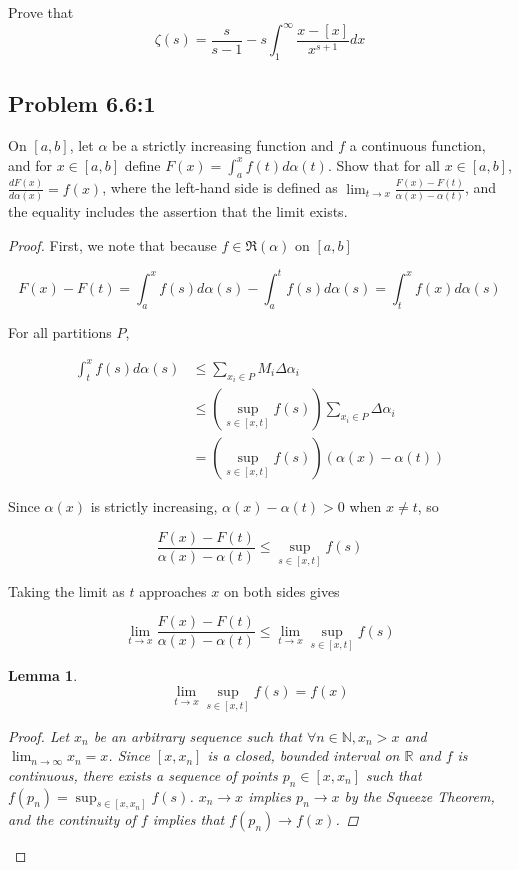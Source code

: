 \documentclass{amsart}
\newcommand{\RiemannIntable}{
  \mathfrak{R}
}
\newtheorem{lemma}[theorem]{Lemma}
\begin{document}
Prove that
\[
\zeta(s) = \frac{s}{s-1} - s\int_1^\infty \frac{x -[x]}{x^{s+1}}dx
\]

\subsection*{Problem 6.6:1}

On $[a, b]$, let $\alpha$ be a strictly increasing function and $f$ a continuous function, and for $x \in [a, b]$ define $F(x) = \int_a^x f(t) d\alpha(t)$. Show that for all $x \in [a, b]$, $\frac{dF(x)}{d \alpha(x)} = f(x)$, where the left-hand side is defined as $\lim_{t \to x} \frac{F(x) - F(t)}{\alpha(x) - \alpha(t)}$, and the equality includes the assertion that the limit exists.

\begin{proof}

First, we note that because $f \in \RiemannIntable(\alpha)$ on $[a, b]$

\[F(x) - F(t) = \int_a^x f(s)d\alpha(s) - \int_a^t f(s) d\alpha(s) = \int_t^x f(x) d\alpha(s)
\]

For all partitions $P$,

\begin{align*}
\int_t^x f(s) d\alpha(s)
& \leq \sum_{x_i \in P} M_i \Delta \alpha_i \\
& \leq \left(\sup_{s \in [x, t]} f(s) \right) \sum_{x_i \in P} \Delta \alpha_i \\
&= \left(\sup_{s \in [x, t]} f(s) \right) (\alpha(x) - \alpha(t))
\end{align*}

Since $\alpha(x)$ is strictly increasing, $\alpha(x) - \alpha(t) > 0$ when $x \neq t$, so

\[
\frac{F(x) - F(t)}{\alpha(x) - \alpha(t)} \leq \sup_{s \in [x, t]} f(s)
\]

Taking the limit as $t$ approaches $x$ on both sides gives

\[
\lim_{t \to x} \frac{F(x) - F(t)}{\alpha(x) - \alpha(t)} \leq \lim_{t \to x} \sup_{s \in [x, t]} f(s)
\]

\begin{lemma}

\[
\lim_{t \to x} \sup_{s \in [x, t]} f(s) = f(x)
\]

\begin{proof}

Let $x_n$ be an arbitrary sequence such that $\forall n \in \mathbb{N}, x_n > x$ and $\lim_{n \to \infty} x_n = x$. Since $[x, x_n]$ is a closed, bounded interval on $\mathbb{R}$ and $f$ is continuous, there exists a sequence of points $p_n \in [x, x_n]$ such that $f(p_n) =  \sup_{s \in [x, x_n]} f(s)$. $x_n \rightarrow x$ implies $p_n \rightarrow x$ by the Squeeze Theorem, and the continuity of $f$ implies that $f(p_n) \rightarrow f(x)$.


\end{proof}
\end{lemma}
\end{proof}
\end{document}

